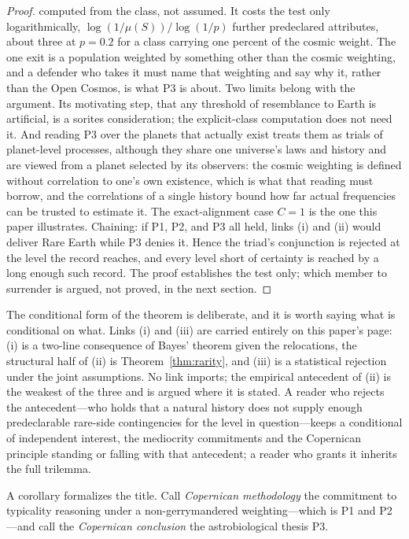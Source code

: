 \begin{proof}
computed from the class, not assumed. It costs the test only logarithmically, $\log(1/\mu(S))/\log(1/p)$ further predeclared attributes, about three at $p = 0.2$ for a class carrying one percent of the cosmic weight. The one exit is a population weighted by something other than the cosmic weighting, and a defender who takes it must name that weighting and say why it, rather than the Open Cosmos, is what P3 is about. Two limits belong with the argument. Its motivating step, that any threshold of resemblance to Earth is artificial, is a sorites consideration; the explicit-class computation does not need it. And reading P3 over the planets that actually exist treats them as trials of planet-level processes, although they share one universe's laws and history and are viewed from a planet selected by its observers: the cosmic weighting is defined without correlation to one's own existence, which is what that reading must borrow, and the correlations of a single history bound how far actual frequencies can be trusted to estimate it. The exact-alignment case $C = 1$ is the one this paper illustrates. Chaining: if P1, P2, and P3 all held, links (i) and (ii) would deliver Rare Earth while P3 denies it. Hence the triad's conjunction is rejected at the level the record reaches, and every level short of certainty is reached by a long enough such record. The proof establishes the test only; which member to surrender is argued, not proved, in the next section.
\end{proof}

The conditional form of the theorem is deliberate, and it is worth saying what is conditional on what. Links (i) and (iii) are carried entirely on this paper's page: (i) is a two-line consequence of Bayes' theorem given the relocations, the structural half of (ii) is Theorem~\ref{thm:rarity}, and (iii) is a statistical rejection under the joint assumptions. No link imports; the empirical antecedent of (ii) is the weakest of the three and is argued where it is stated. A reader who rejects the antecedent---who holds that a natural history does not supply enough predeclarable rare-side contingencies for the level in question---keeps a conditional of independent interest, the mediocrity commitments and the Copernican principle standing or falling with that antecedent; a reader who grants it inherits the full trilemma.

A corollary formalizes the title. Call \emph{Copernican methodology} the commitment to typicality reasoning under a non-gerrymandered weighting---which is P1 and P2---and call the \emph{Copernican conclusion} the astrobiological thesis P3.

